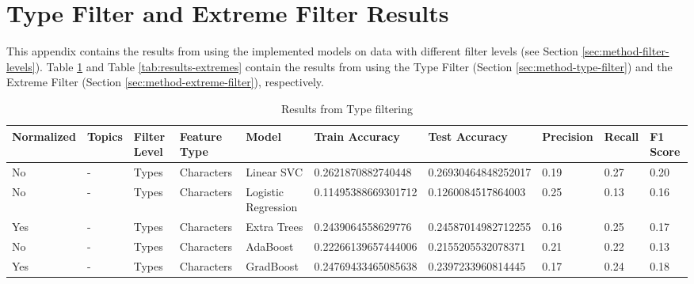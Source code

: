 \section{Type Filter and Extreme Filter Results} \label{appendix:results}
This appendix contains the results from using the implemented models on data with different filter levels (see Section \ref{sec:method-filter-levels}).
Table \ref{tab:results-types} and Table \ref{tab:results-extremes} contain the results from using the Type Filter (Section \ref{sec:method-type-filter}) and the Extreme Filter (Section \ref{sec:method-extreme-filter}), respectively.
\clearpage

  \begin{table}[]
    \centering
    \caption{Results from Type filtering}
    \label{tab:results-types}
    \begin{tabular}{@{}llllllllll@{}}
    \toprule
    \rowcolor[HTML]{FFFFFF} 
    \textbf{Normalized} & \textbf{Topics} & \textbf{Filter Level} & \textbf{Feature Type} & \textbf{Model}      & \textbf{Train Accuracy} & \textbf{Test Accuracy} & \textbf{Precision} & \textbf{Recall} & \textbf{F1 Score} \\ \midrule
    No                  & -               & Types                 & Characters            & Linear SVC          & 0.2621870882740448      & 0.26930464848252017    & 0.19               & 0.27            & 0.20              \\
    No                  & -               & Types                 & Characters            & Logistic Regression & 0.11495388669301712     & 0.1260084517864003     & 0.25               & 0.13            & 0.16              \\
    Yes                 & -               & Types                 & Characters            & Extra Trees         & 0.2439064558629776      & 0.24587014982712255    & 0.16               & 0.25            & 0.17              \\
    No                  & -               & Types                 & Characters            & AdaBoost            & 0.22266139657444006     & 0.2155205532078371     & 0.21               & 0.22            & 0.13              \\
    Yes                 & -               & Types                 & Characters            & GradBoost           & 0.24769433465085638     & 0.2397233960814445     & 0.17               & 0.24            & 0.18              \\

\end{tabular}
\end{table}

